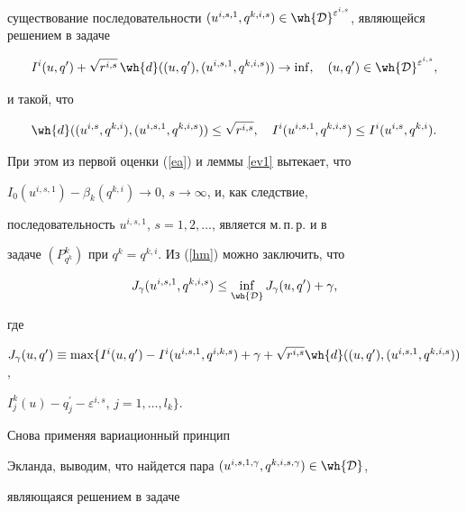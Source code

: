\begin{pf}
существование последовательности $(u^{i,s,1},q^{k,i,s})\in\wh{{\cal


D}}^{\varepsilon^{i,s}}$, являющейся решением в задаче


\begin{equation}\label{hm}


I^i(u,q^\prime)+\sqrt{r^{i,s}}\,\wh{d}((u,q^\prime),(u^{i,s,1},q^{k,i,s}))


\to\inf,  \quad (u,q^\prime)\in\wh{{\cal D}}^{\varepsilon^{i,s}},


\end{equation}


и такой, что


\begin{equation}\label{ea}


\wh{d}((u^{i,s},q^{k,i}),(u^{i,s,1},q^{k,i,s}))\leq\sqrt{r^{i,s}},  \quad


I^i(u^{i,s,1},q^{k,i,s})\leq I^i(u^{i,s},q^{k,i}).


\end{equation}


При этом из первой оценки (\ref{ea}) и леммы \ref{ev1} вытекает, что


$I_0(u^{i,s,1})-\beta_k(q^{k,i})\to0$, $s\to\infty$, и, как следствие,


последовательность $u^{i,s,1}$, $s=1,2,\dotsc$, является м.\,п.\,р. и в


задаче $(P^k_{q^k})$ при $q^k=q^{k,i}$. Из (\ref{hm}) можно заключить, что


\begin{equation*}


J_\gamma(u^{i,s,1},q^{k,i,s})\leq


\inf_{\wh{{\cal D}}}J_\gamma(u,q^\prime)+\gamma,


\end{equation*}


где


$J_\gamma(u,q^\prime)\equiv\max\{I^i(u,q^\prime)-I^i(u^{i,s,1},q^{i,k,s})


+\gamma+\sqrt{r^{i,s}}\wh{d}((u,q^\prime),(u^{i,s,1},q^{k,i,s}))$,


$I^k_j(u)-q^\prime_j-\varepsilon^{i,s}$, $j=1,\dotsc,l_k\}$.


Снова применяя вариационный принцип


Экланда, выводим, что найдется пара $(u^{i,s,1,\gamma},q^{k,i,s,\gamma})\in


\wh{{\cal D}}$,


являющаяся решением в задаче



\end{pf}
